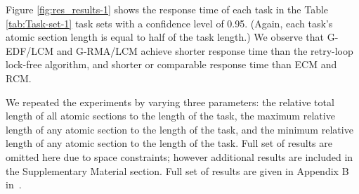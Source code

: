 \documentclass{sig-alternate}
\begin{document}
Figure \ref{fig:res_results-1} shows the response time of each task in the Table \ref{tab:Task-set-1} task sets with a confidence level of 0.95. (Again, each task's atomic section length is equal to half of the task length.) 
We observe that G-EDF/LCM and G-RMA/LCM achieve shorter 
response time than the retry-loop lock-free
algorithm, and shorter 
or comparable response time than ECM and RCM. 

We repeated the experiments by varying three parameters: the relative total length of all atomic sections to the length of the task, the maximum relative length of any atomic section to the length of the task, and the minimum relative length of any atomic section to the length of the task. Full set of results are omitted here due to space constraints; however additional results are included in the Supplementary Material section. Full set of results are given in Appendix B in~\cite{stmconcurrencycontrol_techreport}.
\end{document}
